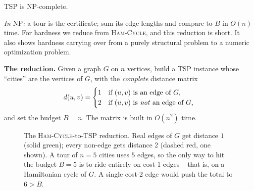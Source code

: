 \begin{theorem}
\label{ch33:tsp}
\textsc{TSP} is NP-complete.
\end{theorem}

\emph{In $\mathrm{NP}$:} a tour is the certificate; sum its edge lengths and
compare to $B$ in $O(n)$ time. For hardness we reduce from \textsc{Ham-Cycle},
and this reduction is short. It also shows hardness carrying over from a purely
structural problem to a numeric optimization problem.

\textbf{The reduction.} Given a graph $G$ on $n$ vertices, build a \textsc{TSP}
instance whose ``cities'' are the vertices of $G$, with the \emph{complete}
distance matrix
\[
  d(u,v) =
  \begin{cases}
    1 & \text{if } (u,v) \text{ is an edge of } G,\\
    2 & \text{if } (u,v) \text{ is \emph{not} an edge of } G,
  \end{cases}
\]
and set the budget $B = n$. The matrix is built in $O(n^2)$ time.

\begin{figure}[h]
\centering
{}
\caption{The \textsc{Ham-Cycle}-to-\textsc{TSP} reduction. Real edges of $G$ get
distance $1$ (solid green); every non-edge gets distance $2$ (dashed red, one
shown). A tour of $n=5$ cities uses $5$ edges, so the only way to hit the budget
$B=5$ is to ride entirely on cost-$1$ edges -- that is, on a Hamiltonian cycle of
$G$. A single cost-$2$ edge would push the total to $6>B$.}
\label{ch33:tsp-fig}
\end{figure}

